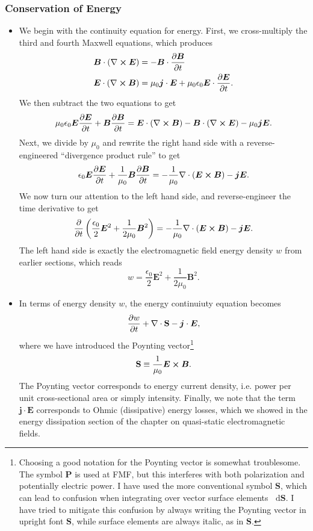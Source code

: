 \documentclass[11pt, a4paper]{article}
\newcommand{\diff}{\mathop{}\!\mathrm{d}} %
\newcommand{\Poy}{Poynting\xspace}
\renewcommand{\vec}[1]{\bm{#1}} %
\newcommand{\E}{\vec{E}} %
\newcommand{\B}{\vec{B}} %
\renewcommand{\S}{\mathbf{S}}  %
\newcommand{\ee}{\epsilon_{0}}  %
\newcommand{\mm}{\mu_{0}}  %
\renewcommand{\j}{\vec{j}}  %
\renewcommand{\div}{\nabla \cdot}
\renewcommand{\curl}{\nabla \cross}
\begin{document}
\subsubsection{Conservation of Energy}
\begin{itemize}
	\item We begin with the continuity equation for energy. First, we cross-multiply the third and fourth Maxwell equations, which produces
	\begin{align*}
		& \B \cdot (\curl \E) = - \B \cdot \pdv{\B}{t}\\
		& \E \cdot (\curl \B) = \mm \j \cdot \E + \mm \ee \E \cdot \pdv{\E}{t}.
	\end{align*}
	We then subtract the two equations to get
	\begin{equation*}
		\mm \ee \E \pdv{\E}{t} + \B \pdv{\B}{t} = \E\cdot(\curl \B) - \B\cdot(\curl \E) - \mm \j \E.
	\end{equation*}
	Next, we divide by $ \mm $ and rewrite the right hand side with a reverse-engineered ``divergence product rule'' to get
	\begin{equation*}
		\ee \E \pdv{\E}{t} + \frac{1}{\mm}\B \pdv{\B}{t} = - \frac{1}{\mm}\div(\E\cross\B) - \j \E.
	\end{equation*}
	We now turn our attention to the left hand side, and reverse-engineer the time derivative to get
	\begin{equation*}
		\pdv{t}\left(\frac{\ee}{2} \E^{2} + \frac{1}{2\mm}\B^{2}\right) = - \frac{1}{\mm}\div(\E\cross\B) - \j \E.
	\end{equation*}
	The left hand side is exactly the electromagnetic field energy density $ w $ from earlier sections, which reads
	\begin{equation*}
		w = \frac{\ee}{2} \E^{2} + \frac{1}{2\mm}\B^{2}.
	\end{equation*}
	
	\item In terms of energy density $ w $, the energy continuiuty equation becomes
	\begin{equation*}
		\pdv{w}{t} + \div \S - \j \cdot \E,
	\end{equation*}
    where we have introduced the \Poy vector\footnote{Choosing a good notation for the Poynting vector is somewhat troublesome. The symbol $ \vec{P} $ is used at FMF, but this interferes with both polarization and potentially electric power. I have used the more conventional symbol $ \S $, which can lead to confusion when integrating over vector surface elements $ \diff \vec{S} $. I have tried to mitigate this confusion by always writing the Poynting vector in upright font $ \S $, while surface elements are always italic, as in $ \vec{S} $.}
	\begin{equation*}
		\S \equiv \frac{1}{\mm}\E \cross \B.
	\end{equation*}
	The \Poy vector corresponds to energy current density, i.e. power per unit cross-sectional area or simply intensity. Finally, we note that the term $ \j \cdot \E $ corresponds to Ohmic (dissipative) energy losses, which we showed in the energy dissipation section of the chapter on quasi-static electromagnetic fields.
	

\end{itemize}
\end{document}
